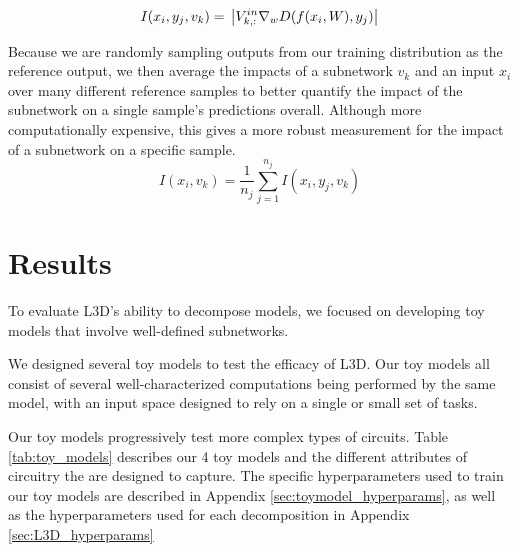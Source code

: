 \documentclass{article}
\theoremstyle{plain}
\theoremstyle{definition}
\theoremstyle{remark}
\begin{document}
\begin{equation}
    I(x_i, y_j, v_k) = \\
    \left| V^{in}_{k,:} \nabla_w D(f(x_i, W), y_j) \right|
\end{equation}

Because we are randomly sampling outputs from our training distribution as the reference output, we then average the impacts of a subnetwork $v_k$ and an input $x_i$ over many different reference samples to better quantify the impact of the subnetwork on a single sample's predictions overall. Although more computationally expensive, this gives a more robust measurement for the impact of a subnetwork on a specific sample. 
\begin{equation}
    I(x_i, v_k) = \frac{1}{n_j} \sum_{j=1}^{n_j} I(x_i, y_j, v_k)
\end{equation}
\section{Results}\label{sec:results}

To evaluate L3D's ability to decompose models, we focused on developing toy models that involve well-defined subnetworks.

We designed several toy models to test the efficacy of L3D. Our toy models all consist of several well-characterized computations being performed by the same model, with an input space designed to rely on a single or small set of tasks. 

Our toy models progressively test more complex types of circuits. Table \ref{tab:toy_models} describes our 4 toy models and the different attributes of circuitry the are designed to capture. The specific hyperparameters used to train our toy models are described in Appendix \ref{sec:toymodel_hyperparams}, as well as the hyperparameters used for each decomposition in Appendix \ref{sec:L3D_hyperparams}
\end{document}
